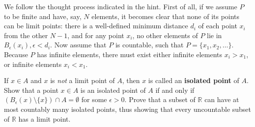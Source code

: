 \begin{solution}
    
    We follow the thought process indicated in the hint.
    First of all, if we assume $P$ to be finite and have, say, $N$ elements, it becomes clear that none of its points can be limit points: there is a well-defined minimum distance $d_i$ of each point $x_i$ from the other $N - 1$, and for any point $x_i$, no other elements of $P$ lie in $B_\epsilon(x_i), \epsilon < d_i$.
    Now assume that $P$ is countable, such that $P = \{x_1, x_2, \ldots\}$.
    Because $P$ has infinite elements, there must exist either infinite elements $x_i > x_1$, or infinite elements $x_i < x_1$.
\end{solution}

\begin{exercise}{40}
    If $x \in A$ and $x$ is \textit{not} a limit point of $A$, then $x$ is called an \textbf{isolated point} of $A$.
    Show that a point $x \in A$ is an isolated point of $A$ if and only if $(B_{\epsilon}(x) \setminus \{x\}) \cap A = \emptyset$ for some $\epsilon > 0$.
    Prove that a subset of $\mathbb{R}$ can have at most countably many isolated points, thus showing that every uncountable subset of $\mathbb{R}$ has a limit point.
\end{exercise}


